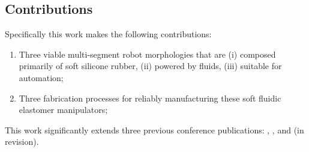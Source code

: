 \subsection{Contributions}
Specifically this work makes the following contributions:
\begin{enumerate}
  \item Three viable multi-segment robot morphologies that are (i) composed primarily of soft silicone rubber, (ii) powered by fluids, (iii) suitable for automation;
  \item Three fabrication processes for reliably manufacturing these soft fluidic elastomer manipulators;
\end{enumerate}
This work significantly extends three previous conference publications: \citep{marchese2014design}, \citep{marchese2014whole}, and \citep{katzschmann2015autonomous} (in revision). %